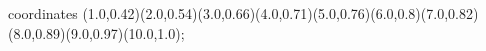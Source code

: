 					coordinates { (1.0,0.42)(2.0,0.54)(3.0,0.66)(4.0,0.71)(5.0,0.76)(6.0,0.8)(7.0,0.82)(8.0,0.89)(9.0,0.97)(10.0,1.0)};